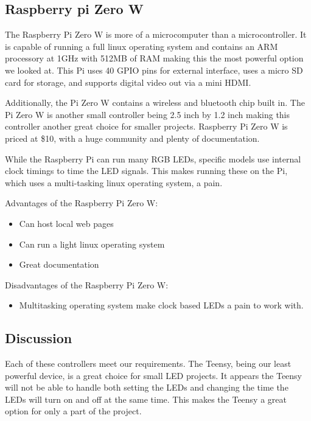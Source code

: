 	\subsection{Raspberry pi Zero W}

	\vspace{5mm}
	\noindent The Raspberry Pi Zero W is more of a microcomputer than a microcontroller.
	It is capable of running a full linux operating system and
	contains an ARM processory at 1GHz with 512MB of RAM making this the most
	powerful option we looked at. This Pi uses 40 GPIO pins for
	external interface, uses a micro SD card for storage, and supports digital
	video out via a mini HDMI\cite[Pg 7]{pizero}.

	\vspace{5mm}
	\noindent Additionally, the Pi Zero W contains a wireless and bluetooth chip built in.
	The Pi Zero W is another small controller being 2.5 inch by 1.2 inch
	making this controller another great choice for smaller projects.
	Raspberry Pi Zero W is priced at \$10, with a huge community and plenty of documentation.

	\vspace{5mm}
	\noindent While the Raspberry Pi can run many RGB LEDs, specific models use internal
	clock timings to time the LED signals. This makes running these on the Pi,
	which uses a multi-tasking linux operating system, a pain.

	\vspace{5mm}
	\noindent Advantages of the Raspberry Pi Zero W:
	\begin{itemize}
		\item Can host local web pages
		\item Can run a light linux operating system
		\item Great documentation
	\end{itemize}
	Disadvantages of the Raspberry Pi Zero W:
	\begin{itemize}
		\item Multitasking operating system make clock based LEDs a pain to
		work with.
	\end{itemize}

	\subsection{Discussion}
	\noindent Each of these controllers meet our
	requirements. The Teensy, being our least powerful device, is a great choice
	for small LED projects. It appears the Teensy will not be able to handle
	both setting the LEDs and changing the time the LEDs will turn on and off
	at the same time. This makes the Teensy a great option for only a part of
	the project.

